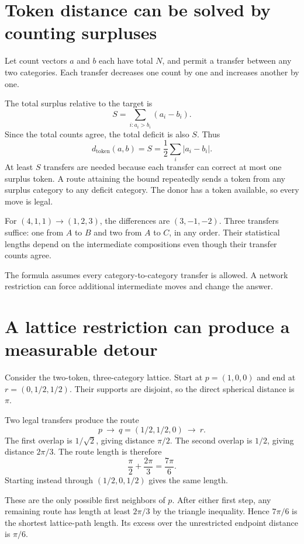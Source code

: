 \documentclass[11pt,oneside,openany]{book}
\theoremstyle{definition}
\theoremstyle{remark}
\numberwithin{equation}{chapter}
\begin{document}
\section{Token distance can be solved by counting surpluses}\label{ch08-token-distance-can-be-solved-by-counting-surpluses}

Let count vectors \(a\) and \(b\) each have total \(N\), and permit a transfer between any two categories. Each transfer decreases one count by one and increases another by one.

The total surplus relative to the target is \[S=\sum_{i:a_i>b_i}(a_i-b_i).\] Since the total counts agree, the total deficit is also \(S\). Thus \[\boxed{d_{\mathrm{token}}(a,b)=S=\frac12\sum_i|a_i-b_i|.}\] At least \(S\) transfers are needed because each transfer can correct at most one surplus token. A route attaining the bound repeatedly sends a token from any surplus category to any deficit category. The donor has a token available, so every move is legal.

For \((4,1,1)\to(1,2,3)\), the differences are \((3,-1,-2)\). Three transfers suffice: one from \(A\) to \(B\) and two from \(A\) to \(C\), in any order. Their statistical lengths depend on the intermediate compositions even though their transfer counts agree.

The formula assumes every category-to-category transfer is allowed. A network restriction can force additional intermediate moves and change the answer.

\section{A lattice restriction can produce a measurable detour}\label{ch08-a-lattice-restriction-can-produce-a-measurable-detour}

Consider the two-token, three-category lattice. Start at \(p=(1,0,0)\) and end at \(r=(0,1/2,1/2)\). Their supports are disjoint, so the direct spherical distance is \(\pi\).

Two legal transfers produce the route \[p\ \longrightarrow\ q=(1/2,1/2,0)\ \longrightarrow\ r.\] The first overlap is \(1/\sqrt2\), giving distance \(\pi/2\). The second overlap is \(1/2\), giving distance \(2\pi/3\). The route length is therefore \[\frac\pi2+\frac{2\pi}3=\frac{7\pi}6.\] Starting instead through \((1/2,0,1/2)\) gives the same length.

These are the only possible first neighbors of \(p\). After either first step, any remaining route has length at least \(2\pi/3\) by the triangle inequality. Hence \(7\pi/6\) is the shortest lattice-path length. Its excess over the unrestricted endpoint distance is \(\pi/6\).
\end{document}

